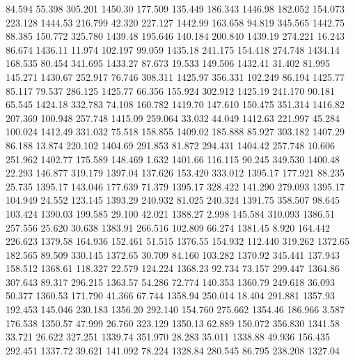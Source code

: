   84.594   55.398  305.201      1450.30
 177.509  135.449  186.343      1446.98
 182.052  154.073  223.128      1444.53
 216.799   42.320  227.127      1442.99
 163.658   94.819  345.565      1442.75
  88.385  150.772  325.780      1439.48
 195.646  140.184  200.840      1439.19
 274.221   16.243   86.674      1436.11
  11.974  102.197   99.059      1435.18
 241.175  154.418  274.748      1434.14
 168.535   80.454  341.695      1433.27
  87.673   19.533  149.506      1432.41
  31.402   81.995  145.271      1430.67
 252.917   76.746  308.311      1425.97
 356.331  102.249   86.194      1425.77
  85.117   79.537  286.125      1425.77
  66.356  155.924  302.912      1425.19
 241.170   90.181   65.545      1424.18
 332.783   74.108  160.782      1419.70
 147.610  150.475  351.314      1416.82
 207.369  100.948  257.748      1415.09
 259.064   33.032   44.049      1412.63
 221.997   45.284  100.024      1412.49
 331.032   75.518  158.855      1409.02
 185.888   85.927  303.182      1407.29
  86.188   13.874  220.102      1404.69
 291.853   81.872  294.431      1404.42
 257.748   10.606  251.962      1402.77
 175.589  148.469    1.632      1401.66
 116.115   90.245  349.530      1400.48
  22.293  146.877  319.179      1397.04
 137.626  153.420  333.012      1395.17
 177.921   88.235   25.735      1395.17
 143.046  177.639   71.379      1395.17
 328.422  141.290  279.093      1395.17
 104.949   24.552  123.145      1393.29
 240.932   81.025  240.324      1391.75
 358.507   98.645  103.424      1390.03
 199.585   29.100   42.021      1388.27
   2.998  145.584  310.093      1386.51
 257.556   25.620   30.638      1383.91
 266.516  102.809   66.274      1381.45
   8.920  164.442  226.623      1379.58
 164.936  152.461   51.515      1376.55
 154.932  112.440  319.262      1372.65
 182.565   89.509  330.145      1372.65
  30.709   84.160  103.282      1370.92
 345.441  137.943  158.512      1368.61
 118.327   22.579  124.224      1368.23
  92.734   73.157  299.447      1364.86
 307.643   89.317  296.215      1363.57
  54.286   72.774  140.353      1360.79
 249.618   36.093   50.377      1360.53
 171.790   41.366   67.744      1358.94
 250.014   18.404  291.881      1357.93
 192.453  145.046  230.183      1356.20
 292.140  154.760  275.662      1354.46
 186.966    3.587  176.538      1350.57
  47.999   26.760  323.129      1350.13
  62.889  150.072  356.830      1341.58
  33.721   26.622  327.251      1339.74
 351.970   28.283   35.011      1338.88
  49.936  156.435  292.451      1337.72
  39.621  141.092   78.224      1328.84
 280.545   86.795  238.208      1327.04
